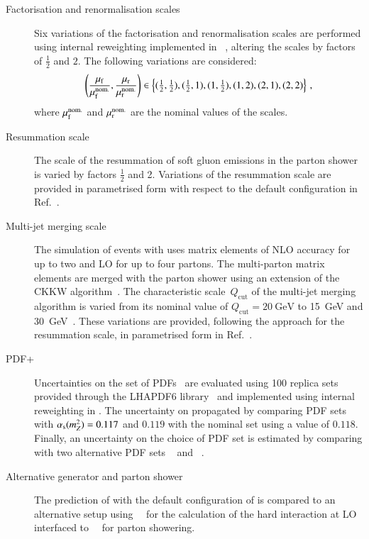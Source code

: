 \begin{description}

\item[Factorisation and renormalisation scales] Six variations of the
  factorisation and renormalisation scales are performed using
  internal reweighting implemented in
  \SHERPA[2.2.1]~\cite{Bothmann:2019yzt}, altering the scales by
  factors of $\frac{1}{2}$ and $2$. The following variations are
  considered:
  \begin{align*}
    \left( \frac{\mu_\mathrm{f}}{\mu_\mathrm{f}^{\text{nom.}}}, \frac{\mu_\mathrm{r}}{\mu_\mathrm{r}^{\text{nom.}}} \right) \in
    \left\{ (\tfrac{1}{2}, \tfrac{1}{2}), (\tfrac{1}{2}, 1), (1, \tfrac{1}{2}), (1, 2), (2, 1), (2, 2) \right\} \,\text{,}
  \end{align*}
  where $\mu_\mathrm{f}^{\text{nom.}}$ and $\mu_\mathrm{r}^{\text{nom.}}$ are the nominal
  values of the scales.

\item[Resummation scale] The scale of the resummation of soft gluon
  emissions in the \SHERPA parton shower is varied by factors
  $\frac{1}{2}$ and 2. Variations of the resummation scale are
  provided in parametrised form with respect to the default \SHERPA
  configuration in Ref.~\cite{anders:2017}.

\item[Multi-jet merging scale] The simulation of \Zjets events with
  \SHERPA[2.2.1] uses matrix elements of NLO accuracy for up to two
  and LO for up to four partons. The multi-parton matrix elements are
  merged with the parton shower using an extension of the CKKW
  algorithm~\cite{Catani:2001cc,Hoeche:2009rj,Hoeche:2012yf}. The
  characteristic scale~$Q_{\text{cut}}$ of the multi-jet merging
  algorithm is varied from its nominal value of
  $Q_{\text{cut}} = \SI{20}{\GeV}$ to \SI{15}{\GeV} and
  \SI{30}{\GeV}~\cite{anders:2017}. These variations are provided,
  following the approach for the resummation scale, in parametrised
  form in Ref.~\cite{anders:2017}.

\item[PDF+\alphas] Uncertainties on the \NNPDF[3.0nnlo] set of
  PDFs~\cite{Ball:2014uwa} are evaluated using 100 replica sets
  provided through the \textsc{LHAPDF6} library~\cite{Buckley:2014ana}
  and implemented using internal reweighting in \SHERPA. The
  uncertainty on \alphas propagated by comparing \NNPDF[3.0nnlo] PDF
  sets with $\alpha_{\text{s}}(m_{Z}^2) = 0.117$ and $0.119$ with the nominal set
  using a value of $0.118$. Finally, an uncertainty on the choice of
  PDF set is estimated by comparing with two alternative PDF sets
  \MMHT[nnlo68cl]~\cite{Harland-Lang:2014zoa} and
  \CT[14nnlo]~\cite{Dulat:2015mca}.

\item[Alternative generator and parton shower] The prediction of
  \Zjets with the default configuration of \SHERPA[2.2.1] is compared
  to an alternative setup using~\MGNLO[2.2.2]~\cite{Alwall:2014hca}
  for the calculation of the hard interaction at LO interfaced
  to~\PYTHIA[8.186]~\cite{Sjostrand:2007gs} for parton showering.

\end{description}
